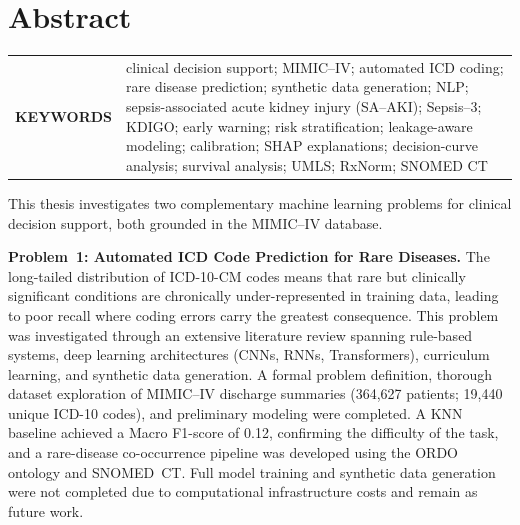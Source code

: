 \chapter{Abstract} \begin{tabular}{@{} >{\bfseries}p{} p{} @{}} \MakeUppercase{Keywords} & clinical decision support; MIMIC--IV; automated ICD coding; rare disease prediction; synthetic data generation; NLP; sepsis-associated acute kidney injury (SA--AKI); Sepsis--3; KDIGO; early warning; risk stratification; leakage-aware modeling; calibration; SHAP explanations; decision-curve analysis; survival analysis; UMLS; RxNorm; SNOMED CT\\ \end{tabular} \par \begin{doublespacing}
This thesis investigates two complementary machine learning problems for clinical decision support, both grounded in the MIMIC--IV database.

\textbf{Problem~1: Automated ICD Code Prediction for Rare Diseases.} The long-tailed distribution of ICD-10-CM codes means that rare but clinically significant conditions are chronically under-represented in training data, leading to poor recall where coding errors carry the greatest consequence. This problem was investigated through an extensive literature review spanning rule-based systems, deep learning architectures (CNNs, RNNs, Transformers), curriculum learning, and synthetic data generation. A formal problem definition, thorough dataset exploration of MIMIC--IV discharge summaries (364,627 patients; 19,440 unique ICD-10 codes), and preliminary modeling were completed. A KNN baseline achieved a Macro F1-score of 0.12, confirming the difficulty of the task, and a rare-disease co-occurrence pipeline was developed using the ORDO ontology and SNOMED~CT. Full model training and synthetic data generation were not completed due to computational infrastructure costs and remain as future work.


\end{doublespacing}
